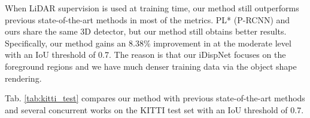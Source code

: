 \documentclass[10pt,twocolumn,letterpaper]{article}
\begin{document}
When LiDAR supervision is used at training time, our method still outperforms previous state-of-the-art methods in most of the metrics.
PL* (P-RCNN) and ours share the same 3D detector, but our method still obtains better results.
Specifically, our method gains an 8.38\% improvement in  at the moderate level with an IoU threshold of 0.7.
The reason is that our iDispNet focuses on the foreground regions and we have much denser training data via the object shape rendering.

\begin{table}
\setlength{\belowcaptionskip}{-0.3cm}
\begin{center}
    \renewcommand{\arraystretch}{1.3}
\end{center}
\caption{\textbf{Disparity EPE and Depth RMSE comparison}, evaluated on the KITTI \textit{validation set}. 
We use our disparity pseudo-GT and sparse LiDAR as ground-truth for evaluation, denoted by PGT and LiDAR respectively.}
\vspace{-0.3cm}
\label{tab:disp_comparison}
\end{table} 
Tab. \ref{tab:kitti_test} compares our method with previous state-of-the-art methods and several concurrent works on the KITTI test set with an IoU threshold of 0.7.
\end{document}
